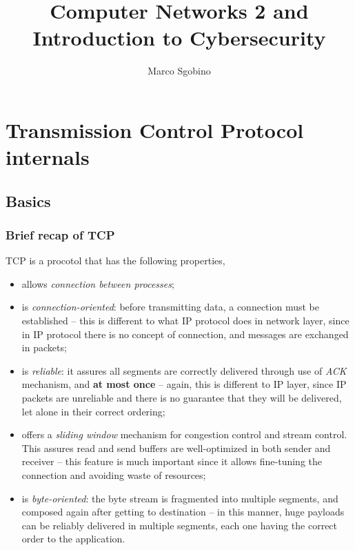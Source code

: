 \documentclass[a4paper, 11pt]{report}
\begin{document}
\title{Computer Networks 2 and Introduction to Cybersecurity}
\author{Marco Sgobino}
\maketitle
\tableofcontents

\part{Transmission Control Protocol internals}

\chapter{Basics}

\section{Brief recap of TCP}
TCP is a procotol that has the following properties,

\begin{itemize}
	\item allows \emph{connection between processes};
	\item is \emph{connection-oriented}: before transmitting data, a
		connection must be established \--- this is different to what
		IP protocol does in network layer, since in IP protocol there
		is no concept of connection, and messages are exchanged in
		packets;
	\item is \emph{reliable}: it assures all segments are correctly
		delivered through use of \emph{ACK} mechanism, and \textbf{at
		most once} \--- again, this is different to IP layer, since IP
		packets are unreliable and there is no guarantee that they will
		be delivered, let alone in their correct ordering;
	\item offers a \emph{sliding window} mechanism for congestion control
		and stream control. This assures read and send buffers are
		well-optimized in both sender and receiver \--- this feature is
		much important since it allows fine-tuning the connection and
		avoiding waste of resources;
	\item is \emph{byte-oriented}: the byte stream is fragmented into
		multiple segments, and composed again after getting to
		destination \--- in this manner, huge payloads can be reliably
		delivered in multiple segments, each one having the correct
		order to the application.
\end{itemize}
\end{document}
